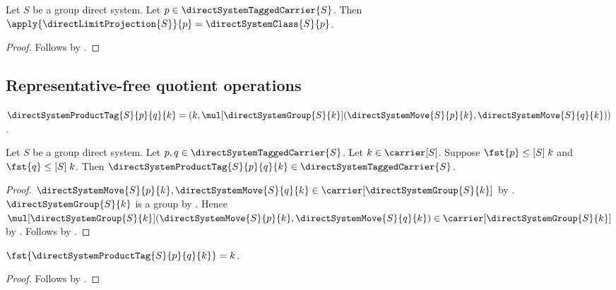 \begin{proposition}\label{direct_limit_projection_apply}
    Let $S$ be a group direct system.
    Let $p\in\directSystemTaggedCarrier{S}$.
    Then $\apply{\directLimitProjection{S}}{p}
        =\directSystemClass{S}{p}$.
\end{proposition}
\begin{proof}
    Follows by
        .
\end{proof}

\subsection{Representative-free quotient operations}

\begin{definition}\label{direct_system_product_tag}
    $\directSystemProductTag{S}{p}{q}{k}=
        (k,\mul[\directSystemGroup{S}{k}]
            (\directSystemMove{S}{p}{k},
             \directSystemMove{S}{q}{k}))$.
\end{definition}

\begin{proposition}\label{direct_system_product_tag_type}
    Let $S$ be a group direct system.
    Let $p,q\in\directSystemTaggedCarrier{S}$.
    Let $k\in\carrier[S]$.
    Suppose $\fst{p}\mathrel{\leq[S]}k$ and
        $\fst{q}\mathrel{\leq[S]}k$.
    Then $\directSystemProductTag{S}{p}{q}{k}\in
        \directSystemTaggedCarrier{S}$.
\end{proposition}
\begin{proof}
    $\directSystemMove{S}{p}{k},\directSystemMove{S}{q}{k}\in
        \carrier[\directSystemGroup{S}{k}]$ by
        .
    $\directSystemGroup{S}{k}$ is a group by
        .
    Hence $\mul[\directSystemGroup{S}{k}]
        (\directSystemMove{S}{p}{k},\directSystemMove{S}{q}{k})\in
        \carrier[\directSystemGroup{S}{k}]$ by
        .
    Follows by
        .
\end{proof}

\begin{proposition}\label{direct_system_product_tag_first}
    $\fst{\directSystemProductTag{S}{p}{q}{k}}=k$.
\end{proposition}
\begin{proof}
    Follows by .
\end{proof}

